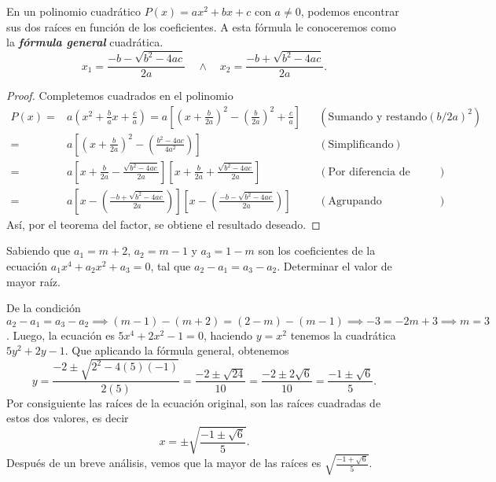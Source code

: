 En un polinomio cuadrático $P(x) = ax^2 + bx + c$ con $a \neq 0$, podemos encontrar sus dos raíces en función de los coeficientes.
A esta fórmula le conoceremos como la \textbf{\emph{fórmula general}} cuadrática.
\[
    x_1 = \frac{-b - \sqrt {b^2 - 4ac}}{2a}\quad\land\quad x_2 = \frac{-b + \sqrt {b^2 - 4ac}}{2a}.
\]
\begin{proof}
    Completemos cuadrados en el polinomio
    \begin{align*}
        P(x) =& a \left( x^2 + \frac{b}{a}x + \frac{c}{a} \right) = a \left[ \left( x + \frac{b}{2a} \right)^2 - \left( \frac{b}{2a} \right)^2 + \frac{c}{a} \right] && (\text{Sumando y restando} \left( b/2a \right)^2)\\
        =& a \left[ \left( x + \frac{b}{2a} \right)^2 - \left( \frac{b^2 - 4ac}{4a^2}\right) \right]  && (\text{Simplificando})\\
        =& a \left[ x + \frac{b}{2a} - \frac{\sqrt {b^2 - 4ac}}{2a}\right]\left[ x + \frac{b}{2a} + \frac{\sqrt {b^2 - 4ac}}{2a}\right]  && (\text{Por diferencia de cuadrados})\\
        =& a \left[ x - \left( \frac{-b + \sqrt {b^2 - 4ac}}{2a} \right) \right]\left[ x - \left( \frac{-b - \sqrt {b^2 - 4ac}}{2a} \right) \right] && (\text{Agrupando coeficientes})
    \end{align*}
    Así, por el teorema del factor, se obtiene el resultado deseado.
\end{proof}

\begin{example}
    Sabiendo que $a_1 = m + 2$, $a_2 = m - 1$ y $a_3 = 1 - m$ son los coeficientes de la ecuación $a_1 x^4 + a_2 x^2 + a_3 = 0$, tal que $a_2 - a_1 = a_3 - a_2$.
    Determinar el valor de mayor raíz.
\end{example}
\begin{solution}
    De la condición $a_2 - a_1 = a_3 - a_2 \implies (m - 1) - (m + 2) = (2 - m) - (m - 1) \implies -3 = -2m + 3 \implies m = 3$.
    Luego, la ecuación es $5x^4 + 2x^2 - 1 = 0$, haciendo $y = x^2$ tenemos la cuadrática $5y^2 + 2y - 1$.
    Que aplicando la fórmula general, obtenemos
    \[
        y = \frac{-2 \pm \sqrt{2^2 - 4(5)(-1)}}{2(5)} = \frac{-2 \pm \sqrt{24}}{10} = \frac{-2 \pm 2\sqrt{6}}{10} = \frac{-1 \pm \sqrt{6}}{5}.
    \]
    Por consiguiente las raíces de la ecuación original, son las raíces cuadradas de estos dos valores, es decir
    \[
        x = \pm \sqrt {\frac{-1 \pm \sqrt{6}}{5}}.
    \]
    Después de un breve análisis, vemos que la mayor de las raíces es $\sqrt {\frac{-1 + \sqrt{6}}{5}}$.
\end{solution}

